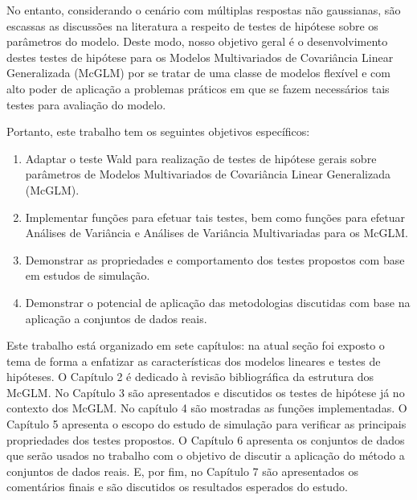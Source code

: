 No entanto, considerando o cenário com múltiplas respostas não gaussianas, são escassas as discussões na literatura a respeito de testes de hipótese sobre os parâmetros do modelo. Deste modo, nosso objetivo geral é o desenvolvimento destes testes de hipótese para os Modelos Multivariados de Covariância Linear Generalizada (McGLM) por se tratar de uma classe de modelos flexível e com alto poder de aplicação a problemas práticos em que se fazem necessários tais testes para avaliação do modelo.

Portanto, este trabalho tem os seguintes objetivos específicos:

\begin{enumerate}
  
  \item Adaptar o teste Wald para realização de testes de hipótese gerais sobre parâmetros de Modelos Multivariados de Covariância Linear Generalizada (McGLM).
  
  \item Implementar funções para efetuar tais testes, bem como funções para efetuar Análises de Variância e Análises de Variância Multivariadas para os McGLM.
  
  \item Demonstrar as propriedades e comportamento dos testes propostos com base em estudos de simulação.
  
  \item Demonstrar o potencial de aplicação das metodologias discutidas com base na aplicação a conjuntos de dados reais.
  
\end{enumerate}

Este trabalho está organizado em sete capítulos: na atual seção foi exposto o tema de forma a enfatizar as características dos modelos lineares e testes de hipóteses. O Capítulo 2 é dedicado à revisão bibliográfica da estrutura dos McGLM. No Capítulo 3 são apresentados e discutidos os testes de hipótese já no contexto dos McGLM. No capítulo 4 são mostradas as funções implementadas. O Capítulo 5 apresenta o escopo do estudo de simulação para verificar as principais propriedades dos testes propostos. O Capítulo 6 apresenta os conjuntos de dados que serão usados no trabalho com o objetivo de discutir a aplicação do método a conjuntos de dados reais. E, por fim, no Capítulo 7 são apresentados os comentários finais e são discutidos os resultados esperados do estudo.

